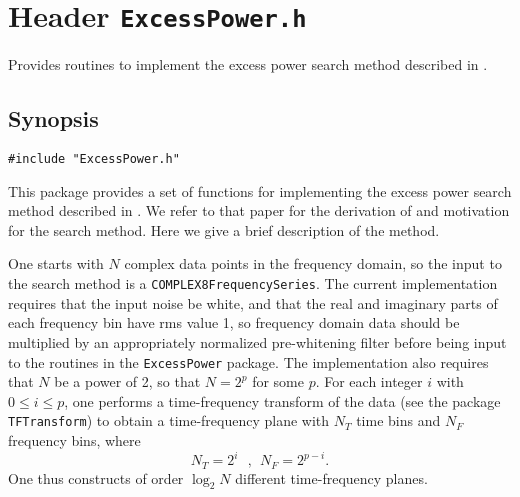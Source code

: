 \newpage
\section{Header \texttt{ExcessPower.h}}
\label{s:ExcessPower.h}

Provides routines to implement the excess power search method 
described in \cite{abcf:2000}. 

\subsection*{Synopsis}
\begin{verbatim}
#include "ExcessPower.h"
\end{verbatim}

This package provides a set of functions for implementing the excess power
search method described in \cite{abcf:2000}.  We refer to that paper for the
derivation of and motivation for the search method.  Here we give a brief
description of the method.

One starts with $N$ complex data points in the frequency domain, so the input
to the search method is a \verb+COMPLEX8FrequencySeries+.  The current
implementation requires that the input noise be white, and that the real and
imaginary parts of each frequency bin have rms value 1, so frequency domain
data should be multiplied by an appropriately normalized pre-whitening filter
before being input to the routines in the \verb+ExcessPower+ package.  The
implementation also requires that $N$ be a power of 2, so that $N =2^p$ for
some $p$.  For each integer $i$ with $0 \le i \le p$, one performs a
time-frequency transform of the data (see the package \verb+TFTransform+) to
obtain a time-frequency plane with $N_T$ time bins and $N_F$ frequency bins,
where
\begin{equation}
  N_T = 2^i \ \ \ , \ \ N_F = 2^{p-i}.
  \label{tfplanes}
\end{equation}
One thus constructs of order $\log_2 N$ different time-frequency planes. 

